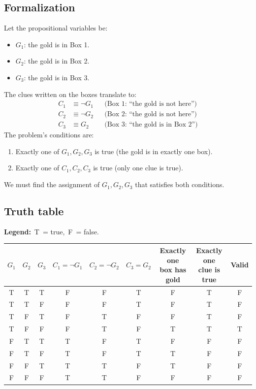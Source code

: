 \documentclass[12pt]{article}
\newcommand{\T}{\cellcolor{truegreen}T}
\newcommand{\F}{\cellcolor{falsered}F}
\begin{document}
\subsection*{Formalization}
Let the propositional variables be:
\begin{itemize}
    \item $G_1$: the gold is in Box 1.
    \item $G_2$: the gold is in Box 2.
    \item $G_3$: the gold is in Box 3.
\end{itemize}
The clues written on the boxes translate to:
\begin{align*}
C_1 &\equiv \neg G_1 && \text{(Box 1: ``the gold is not here'')}\\
C_2 &\equiv \neg G_2 && \text{(Box 2: ``the gold is not here'')}\\
C_3 &\equiv G_2 && \text{(Box 3: ``the gold is in Box 2'')}
\end{align*}
The problem's conditions are:
\begin{enumerate}
    \item Exactly one of $G_1, G_2, G_3$ is true (the gold is in exactly one box).
    \item Exactly one of $C_1, C_2, C_3$ is true (only one clue is true).
\end{enumerate}
We must find the assignment of $G_1,G_2,G_3$ that satisfies both conditions.
 
\subsection*{Truth table}
\noindent\textbf{Legend:} \colorbox{truegreen}{\,T\,} = true, \quad \colorbox{falsered}{\,F\,} = false.
 
\begin{center}
\renewcommand{\arraystretch}{1.3}
\begin{tabular}{|c|c|c|c|c|c|c|c||c|}
\hline
$G_1$ & $G_2$ & $G_3$ & $C_1=\neg G_1$ & $C_2=\neg G_2$ & $C_3=G_2$ & \shortstack{Exactly one\\box has gold} & \shortstack{Exactly one\\clue is true} & \textbf{Valid} \\ \hline
\T & \T & \T & \F & \F & \T & \F & \T & \F \\
\T & \T & \F & \F & \F & \T & \F & \T & \F \\
\T & \F & \T & \F & \T & \F & \F & \T & \F \\
\T & \F & \F & \F & \T & \F & \T & \T & \T \\
\F & \T & \T & \T & \F & \T & \F & \F & \F \\
\F & \T & \F & \T & \F & \T & \T & \F & \F \\
\F & \F & \T & \T & \T & \F & \T & \F & \F \\
\F & \F & \F & \T & \T & \F & \F & \F & \F \\
\hline
\end{tabular}
\end{center}
 
\end{document}
